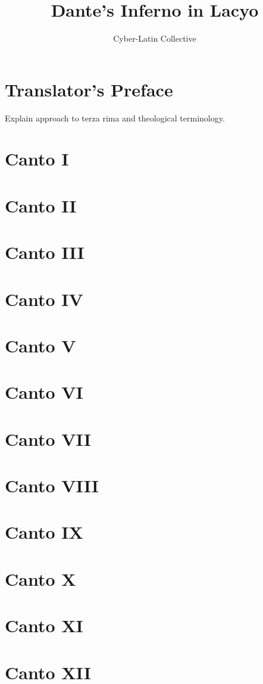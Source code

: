 \documentclass[12pt]{book}
\title{Dante's Inferno in Lacyo}
\author{Cyber-Latin Collective}
\date{}
\begin{document}
\maketitle
\tableofcontents

\chapter{Translator's Preface}
Explain approach to terza rima and theological terminology.

\chapter{Canto I}
\chapter{Canto II}
\chapter{Canto III}
\chapter{Canto IV}
\chapter{Canto V}
\chapter{Canto VI}
\chapter{Canto VII}
\chapter{Canto VIII}
\chapter{Canto IX}
\chapter{Canto X}
\chapter{Canto XI}
\chapter{Canto XII}
\end{document}
